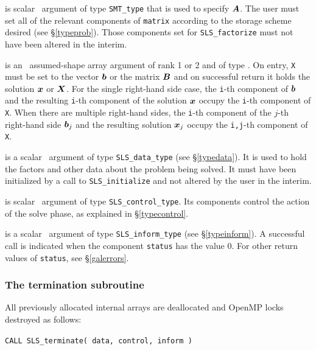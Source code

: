 \documentclass{galahad}
\newcommand{\packagename}{SLS}
\begin{document}
\begin{description}

 is scalar \intentin\ argument of type {\tt SMT\_type}
that is used to specify ${\bm{A}}$.
The user must set all of the relevant components of {\tt matrix} according
to the storage scheme desired (see \S\ref{typeprob}). Those components
set for {\tt \packagename\_factorize} must not have been altered in the interim.

 is an \intentinout\ assumed-shape array argument of rank 1 or 2
and of type \realdp.  On entry, {\tt X} must be set
to the vector ${\bm{b}}$ or the matrix ${\bm{B}}$ and on successful return it holds
the solution ${\bm{x}}$ or ${\bm{X}}$. For the single right-hand side case, the
{\tt i}-th component of ${\bm{b}}$ and the resulting
{\tt i}-th component of the solution ${\bm{x}}$
occupy the {\tt i}-th component of {\tt X}. When there are multiple
right-hand sides, the
{\tt i}-th component of the $j$-th right-hand side ${\bm{b}}_j$
and the resulting solution ${\bm{x}}_j$ occupy the
{\tt i,j}-th component of {\tt X}.

 is a scalar \intentinout\ argument of type
{\tt \packagename\_data\_type}
(see \S\ref{typedata}). It is used to hold the factors and other
data about the problem being solved.
It must have been initialized by a call to
{\tt \packagename\_ini\-tialize} and not altered by the user in the interim.

 is scalar \intentin\ argument of type
{\tt \packagename\_control\_type}. Its components control the action
of the solve phase, as explained in
\S\ref{typecontrol}.

 is a scalar \intentinout\ argument of type
{\tt \packagename\_inform\_type}
(see \S\ref{typeinform}).
A successful call is indicated when the  component {\tt status} has the value 0.
For other return values of {\tt status}, see \S\ref{galerrors}.

\end{description}


\subsubsection{The termination subroutine}
All previously allocated internal arrays are deallocated and OpenMP locks
destroyed as follows:

\hskip0.5in
{\tt CALL \packagename\_terminate( data, control, inform )}
\end{document}
